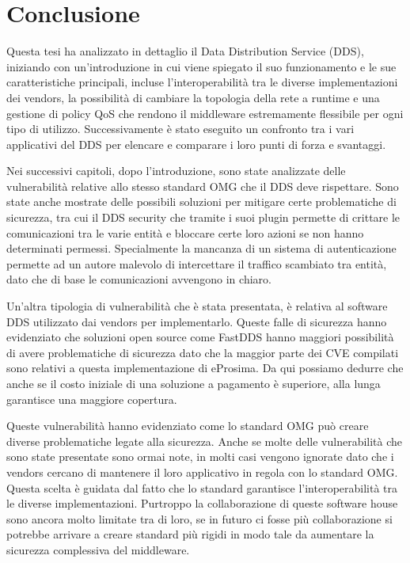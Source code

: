 \chapter{Conclusione}
Questa tesi ha analizzato in dettaglio il Data Distribution Service (DDS),
iniziando con un'introduzione in cui viene spiegato il suo funzionamento 
e le sue caratteristiche principali, incluse l'interoperabilità tra 
le diverse implementazioni dei vendors, la possibilità di 
cambiare la topologia della rete a runtime e una gestione di policy 
QoS che rendono il middleware estremamente flessibile per ogni tipo 
di utilizzo. Successivamente è stato eseguito un confronto tra i 
vari applicativi del DDS per elencare e comparare i loro 
punti di forza e svantaggi.

Nei successivi capitoli, dopo l'introduzione, sono state 
analizzate 
delle vulnerabilità relative allo stesso standard OMG che il 
DDS deve rispettare. Sono state anche mostrate delle
possibili soluzioni per mitigare certe problematiche di
sicurezza, tra cui il DDS security che tramite i suoi plugin 
permette di crittare le comunicazioni tra le varie entità e 
bloccare certe loro azioni se non hanno determinati permessi.
Specialmente la mancanza di un sistema di autenticazione 
permette ad un autore malevolo di intercettare 
il traffico scambiato tra entità, dato che di base le 
comunicazioni avvengono in chiaro.  

Un'altra tipologia di vulnerabilità che è stata presentata, è 
relativa al software DDS utilizzato dai vendors per 
implementarlo. Queste falle di sicurezza hanno evidenziato che 
soluzioni open source come FastDDS hanno maggiori possibilità 
di avere problematiche di sicurezza dato che
la maggior parte dei CVE compilati sono relativi a questa 
implementazione di eProsima. Da qui possiamo dedurre che 
anche se il costo iniziale di una soluzione a pagamento 
è superiore, alla lunga garantisce una maggiore copertura.

Queste vulnerabilità hanno
evidenziato 
come lo standard OMG può creare diverse problematiche 
legate alla sicurezza. 
Anche se molte delle vulnerabilità che sono state presentate 
sono ormai note, in molti casi vengono ignorate 
dato che i vendors cercano di mantenere il loro applicativo 
in regola con lo standard OMG. Questa scelta è guidata dal fatto che 
lo standard garantisce l'interoperabilità tra le diverse implementazioni. 
Purtroppo la collaborazione di queste software house sono ancora 
molto limitate tra di loro, se in futuro ci fosse più collaborazione 
si potrebbe arrivare a creare standard più rigidi in modo tale
da aumentare la sicurezza complessiva del middleware.

